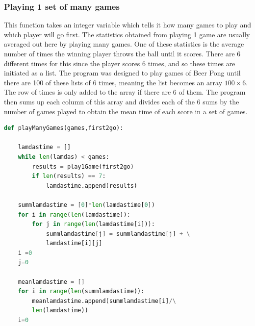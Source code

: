 \documentclass{article}
\begin{document}
\subsubsection{Playing 1 set of many games}

This function takes an integer variable which tells it how many games to play and which player will go first. The statistics obtained from playing 1 game are usually averaged out here by playing many games. One of these statistics is the average number of times the winning player throws the ball until it scores. There are 6 different times for this since the player scores 6 times, and so these times are initiated as a list. The program was designed to play games of Beer Pong until there are 100 of these lists of 6 times, meaning the list becomes an array $100 \times 6$. The row of times is only added to the array if there are 6 of them.
The program then sums up each column of this array and divides each of the 6 sums by the number of games played to obtain the mean time of each score in a set of games.
\begin{lstlisting}[language=Python]
def playManyGames(games,first2go):

    lamdastime = []
    while len(lamdas) < games:
        results = play1Game(first2go)
        if len(results) == 7:
            lamdastime.append(results)

    summlamdastime = [0]*len(lamdastime[0])
    for i in range(len(lamdastime)):
        for j in range(len(lamdastime[i])):
            summlamdastime[j] = summlamdastime[j] + \
            lamdastime[i][j]
    i =0
    j=0

    meanlamdastime = []
    for i in range(len(summlamdastime)):
        meanlamdastime.append(summlamdastime[i]/\
        len(lamdastime))
    i=0
\end{lstlisting}
\end{document}
